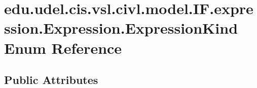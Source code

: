 \hypertarget{enumedu_1_1udel_1_1cis_1_1vsl_1_1civl_1_1model_1_1IF_1_1expression_1_1Expression_1_1ExpressionKind}{}\section{edu.\+udel.\+cis.\+vsl.\+civl.\+model.\+I\+F.\+expression.\+Expression.\+Expression\+Kind Enum Reference}
\label{enumedu_1_1udel_1_1cis_1_1vsl_1_1civl_1_1model_1_1IF_1_1expression_1_1Expression_1_1ExpressionKind}
\subsection*{Public Attributes}
